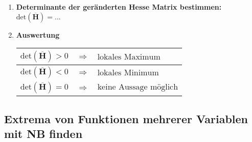 \begin{enumerate}[itemsep=1ex]
\begin{tabular}{lll}
    \end{tabular}


    \item \textbf{Determinante der geränderten Hesse Matrix bestimmen:}\\
    $\text{det}\left(\overline{\mathbf{H}}\right) = ... $

    \item \textbf{Auswertung}\\
    \begin{tabular}{lll}
        \hline
        $\text{det}\left(\overline{\mathbf{H}}\right) > 0$ &$\Longrightarrow$& $\text{lokales Maximum}$\\
        \hline
        $\text{det}\left(\overline{\mathbf{H}}\right) < 0$ &$\Longrightarrow$& $\text{lokales Minimum}$\\
        \hline
        $\text{det}\left(\overline{\mathbf{H}}\right) = 0$ &$\Longrightarrow$& $\text{keine Aussage möglich}$\\
        \hline
    \end{tabular}

\end{enumerate}

\subsection{Extrema von Funktionen mehrerer Variablen mit NB finden}

